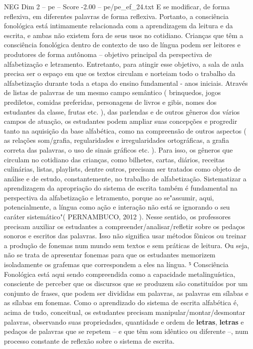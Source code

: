 \begin{textsample}{NEG Dim 2 – pe – Score -2.00 – pe/pe\_ef\_24.txt}
E se modificar, de forma reflexiva, em diferentes palavras de forma reflexiva.
Portanto, a consciência fonológica está intimamente relacionada com a aprendizagem da leitura e da escrita, e ambas não existem fora de seus usos no cotidiano.
Crianças que têm a consciência fonológica dentro de contexto de uso de língua podem ser leitores e produtores de forma autônoma – objetivo principal da perspectiva de alfabetização e letramento.
Entretanto, para atingir esse objetivo, a sala de aula precisa ser o espaço em que os textos circulam e norteiam todo o trabalho da alfabetização durante toda a etapa do ensino fundamental - anos iniciais.
Através de listas de palavras de um mesmo campo semântico ( brinquedos, jogos prediletos, comidas preferidas, personagens de livros e gibis, nomes dos estudantes da classe, frutas etc. ), das parlendas e de outros gêneros dos vários campos de atuação, os estudantes podem ampliar suas concepções e progredir tanto na aquisição da base alfabética, como na compreensão de outros aspectos ( as relações som/grafia, regularidades e irregularidades ortográficas, a grafia correta das palavras, o uso de sinais gráficos etc. ).
Para isso, os gêneros que circulam no cotidiano das crianças, como bilhetes, cartas, diários, receitas culinárias, listas, playlists, dentre outros, precisam ser tratados como objeto de análise e de estudo, constantemente, no trabalho de alfabetização.
Sistematizar a aprendizagem da apropriação do sistema de escrita também é fundamental na perspectiva da alfabetização e letramento, porque ao se"assumir, aqui, potencialmente, a língua como ação e interação não está se ignorando o seu caráter sistemático"( PERNAMBUCO, 2012 ).
Nesse sentido, os professores precisam auxiliar os estudantes a compreender/analisar/refletir sobre os pedaços sonoros e escritos das palavras.
Isso não significa usar métodos fônicos ou treinar a produção de fonemas num mundo sem textos e sem práticas de leitura.
Ou seja, não se trata de apresentar fonemas para que os estudantes memorizem isoladamente os grafemas que correspondem a eles na língua. ⁵ Consciência Fonológica está aqui sendo compreendida como a capacidade metalinguística, consciente de perceber que os discursos que se produzem são constituídos por um conjunto de frases, que podem ser divididas em palavras, as palavras em sílabas e as sílabas em fonemas.
Como o aprendizado do sistema de escrita alfabética é, acima de tudo, conceitual, os estudantes precisam manipular/montar/desmontar palavras, observando suas propriedades, quantidade e ordem de \textbf{letras}, \textbf{letras} e pedaços de palavras que se repetem – e que têm som idêntico ou diferente –, num processo constante de reflexão sobre o sistema de escrita.

\end{textsample}
